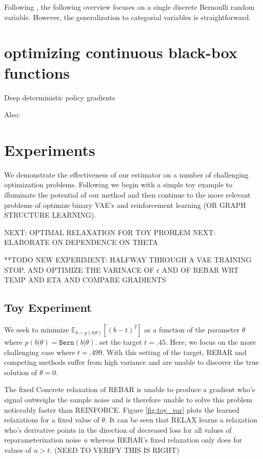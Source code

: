 \documentclass{article}
\newcommand{\relaxed}{r}
\begin{document}
Following \cite{tucker2017rebar}, the following overview focuses on a single discrete Bernoulli random variable.
However, the generalization to categorial variables is straightforward.



\section{optimizing continuous black-box functions}
\label{continuous}
Deep deterministic policy gradients \citep{lillicrap2015continuous}

Also: \citep{levine2016end}


\section{Experiments}
We demonstrate the effectiveness of our estimator on a number of challenging optimization problems. Following \cite{tucker2017rebar} we begin with a simple toy example to illuminate the potential of our method and then continue to the more relevant problems of optimize binary VAE's and reinforcement learning (OR GRAPH STRUCTURE LEARNING).


NEXT: OPTIMAL RELAXATION FOR TOY PROBLEM
NEXT: ELABORATE ON DEPENDENCE ON THETA


**TODO NEW EXPERIMENT: HALFWAY THROUGH A VAE TRAINING STOP, AND OPTIMIZE THE VARINACE OF \relaxed{} AND OF REBAR WRT TEMP AND ETA AND COMPARE GRADIENTS

\subsection{Toy Experiment}
We seek to minimize $\mathbb{E}_{b \sim p(b|\theta)}[(b - t)^2]$ as a function of the parameter $\theta$ where $p(b|\theta) = \mathtt{Bern}(b|\theta)$. \cite{tucker2017rebar} set the target $t = .45$. Here, we focus on the more challenging case where $t = .499$. With this setting of the target, REBAR and competing methods suffer from high variance and are unable to discover the true solution of $\theta = 0$.

The fixed Concrete relaxation of REBAR is unable to produce a gradient who's signal outweighs the sample noise and is therefore unable to solve this problem noticeably faster than REINFORCE. Figure \ref{fig:toy_var} plots the learned relaxations for a fixed value of $\theta$. It can be seen that RELAX learns a relaxation who's derivative points in the direction of decreased loss for all values of reparameterization noise $u$ whereas REBAR's fixed relaxation  only does for values of $u > t$. (NEED TO VERIFY THIS IS RIGHT)
\end{document}

